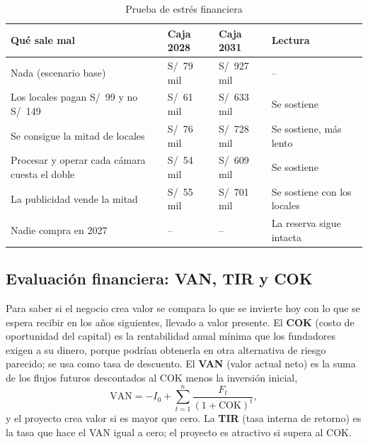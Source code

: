 \documentclass[12pt,a4paper]{article}
\begin{document}
\begin{table}[H]
\caption{Prueba de estrés financiera}
\label{tab:estres-financiero}
\centering
\footnotesize
\renewcommand{\arraystretch}{1.12}
\begin{tabular}{|L{0.36\textwidth}|R{0.14\textwidth}|R{0.14\textwidth}|L{0.24\textwidth}|}
\hline
\textbf{Qué sale mal} & \textbf{Caja 2028} & \textbf{Caja 2031} & \textbf{Lectura} \\
\hline
Nada (escenario base) & S/~79 mil & S/~927 mil & -- \\
\hline
Los locales pagan S/~99 y no S/~149 & S/~61 mil & S/~633 mil & Se sostiene \\
\hline
Se consigue la mitad de locales & S/~76 mil & S/~728 mil & Se sostiene, más lento \\
\hline
Procesar y operar cada cámara cuesta el doble & S/~54 mil & S/~609 mil & Se sostiene \\
\hline
La publicidad vende la mitad & S/~55 mil & S/~701 mil & Se sostiene con los locales \\
\hline
Nadie compra en 2027 & -- & -- & La reserva sigue intacta \\
\hline
\end{tabular}
\end{table}

\FloatBarrier
\subsection{Evaluación financiera: VAN, TIR y COK}

Para saber si el negocio crea valor se compara lo que se invierte hoy con lo que
se espera recibir en los años siguientes, llevado a valor presente. El
\textbf{COK} (costo de oportunidad del capital) es la rentabilidad anual mínima
que los fundadores exigen a su dinero, porque podrían obtenerla en otra
alternativa de riesgo parecido; se usa como tasa de descuento. El \textbf{VAN}
(valor actual neto) es la suma de los flujos futuros descontados al COK menos la
inversión inicial,
\[
\mathrm{VAN} = -I_0 + \sum_{t=1}^{n} \frac{F_t}{(1+\mathrm{COK})^{t}},
\]
y el proyecto crea valor si es mayor que cero. La \textbf{TIR} (tasa interna de
retorno) es la tasa que hace el VAN igual a cero; el proyecto es atractivo si
supera al COK.
\end{document}
